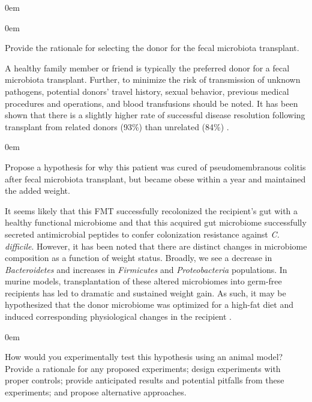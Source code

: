\documentclass[11pt,letterpaper,final] {article}
\newenvironment{exercise}[2][Exercise]{\begin{trivlist}
	\item[\hskip \labelsep {\bfseries #1}\hskip \labelsep {\bfseries #2.}]}{\end{trivlist}}
\newenvironment{problem}[2][Problem]{\begin{addmargin}[0.5in]{0em} \begin{trivlist}
	\item[\hskip \labelsep {\bfseries #1}\hskip \labelsep {\bfseries #2.}]}{\end{trivlist}\end{addmargin}}
\begin{document}
\begin{exercise}[Exercise]{1}
\begin{problem}[Problem]{C}
	\end{problem}
	
	\begin{problem}[Problem]{D} Provide the rationale for selecting the donor for the fecal microbiota transplant.
	
	A healthy family member or friend is typically the preferred donor for a fecal microbiota transplant. Further, to minimize the risk of transmission of unknown pathogens, potential donors' travel history, sexual behavior, previous medical procedures and operations, and blood transfusions should be noted. It has been shown that there is a slightly higher rate of successful disease resolution following transplant from related donors (93\%) than unrelated (84\%) \cite{Smits:2013}.\\
	
	\end{problem}
	
	\begin{problem}[Problem]{E} Propose a hypothesis for why this patient was cured of pseudomembranous colitis after fecal microbiota transplant, but became obese within a year and maintained the added weight.
	
	It seems likely that this FMT successfully recolonized the recipient's gut with a healthy functional microbiome and that this acquired gut microbiome successfully secreted antimicrobial peptides to confer colonization resistance against \textit{C. difficile}. However, it has been noted that there are distinct changes in microbiome composition as a function of weight status. Broadly, we see a decrease in \textit{Bacteroidetes} and increases in \textit{Firmicutes} and \textit{Proteobacteria} populations. In murine models, transplantation of these altered microbiomes into germ-free recipients has led to dramatic and sustained weight gain. As such, it may be hypothesized that the donor microbiome was optimized for a high-fat diet and induced corresponding physiological changes in the recipient \cite{Fleissner:2010, Hildebrandt:2009, DiBaise:2012}.\\
	
	\end{problem}
	
	\begin{problem}[Problem]{F} How would you experimentally test this hypothesis using an animal model? Provide a rationale for any proposed experiments; design experiments with proper controls; provide anticipated results and potential pitfalls from these experiments; and propose alternative approaches.
	

\end{problem}
\end{exercise}
\end{document}
